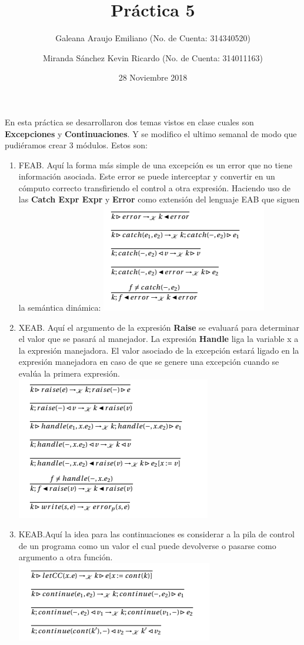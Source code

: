 \documentclass{article}
\title{Práctica 5}
\author{Galeana Araujo Emiliano (No. de Cuenta: 314340520)\\}
\author{Miranda Sánchez Kevin Ricardo (No. de Cuenta: 314011163)}\affil{Facultad de Ciencias, UNAM}
\date{28 Noviembre 2018}
\begin{document}
\maketitle

En esta práctica se desarrollaron dos temas vistos en clase cuales son \textbf{Excepciones} y \textbf{Continuaciones}. 
Y se modifico el ultimo semanal de modo que pudiéramos crear 3 módulos. Estos son: \newline
\begin{enumerate}
    \item FEAB. Aquí la forma más simple de una excepción es un error que no tiene información asociada. Este error se puede interceptar y convertir en un cómputo correcto transfiriendo el control a otra expresión. Haciendo uso de las \textbf{Catch Expr Expr} y \textbf{Error} como extensión del lenguaje EAB que siguen la semántica dinámica: \newline
    \includegraphics[scale=0.5]{1}
    \item XEAB. Aquí el argumento de la expresión \textbf{Raise} se evaluará para determinar el valor que se pasará al manejador. La expresión \textbf{Handle} liga la variable x a la expresión manejadora. El valor asociado de la excepción estará ligado en la expresión manejadora en caso de que se genere una excepción cuando se evalúa la primera expresión.\newline
    \includegraphics[scale=0.5]{4}
    \item KEAB.Aquí la idea para las continuaciones es considerar a la pila de control de un programa como un valor el cual puede devolverse o pasarse como argumento a otra función.\newline
    \includegraphics[scale=0.5]{6}

\end{enumerate}
\end{document}
